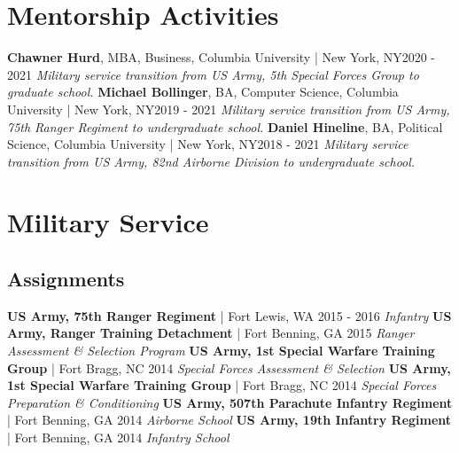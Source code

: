 \documentclass{article}
\begin{document}
    \section*{Mentorship Activities}
        \textbf{Chawner Hurd}, MBA, Business, Columbia University | New York, NY\hfill{2020 - 2021}\newline
        \textit{Military service transition from US Army, 5th Special Forces Group to graduate school.}\newline\newline
        \textbf{Michael Bollinger}, BA, Computer Science, Columbia University | New York, NY\hfill{2019 - 2021}\newline
        \textit{Military service transition from US Army, 75th Ranger Regiment to undergraduate school.}\newline\newline
        \textbf{Daniel Hineline}, BA, Political Science, Columbia University | New York, NY\hfill{2018 - 2021}\newline
        \textit{Military service transition from US Army, 82nd Airborne Division to undergraduate school.}
    \section*{Military Service}
    \subsection*{Assignments}
        \textbf{US Army, 75th Ranger Regiment} | Fort Lewis, WA \hfill{2015 - 2016}\newline
        \textit{Infantry}\newline\newline
        \textbf{US Army, Ranger Training Detachment} | Fort Benning, GA \hfill{2015}\newline
        \textit{Ranger Assessment \& Selection Program}\newline\newline
        \textbf{US Army, 1st Special Warfare Training Group} | Fort Bragg, NC \hfill{2014}\newline
        \textit{Special Forces Assessment \& Selection}\newline\newline
        \textbf{US Army, 1st Special Warfare Training Group} | Fort Bragg, NC \hfill{2014}\newline
        \textit{Special Forces Preparation \& Conditioning}\newline\newline
        \textbf{US Army, 507th Parachute Infantry Regiment} | Fort Benning, GA \hfill{2014}\newline
        \textit{Airborne School}\newline\newline
        \textbf{US Army, 19th Infantry Regiment} | Fort Benning, GA \hfill{2014}\newline
        \textit{Infantry School}
\end{document}
